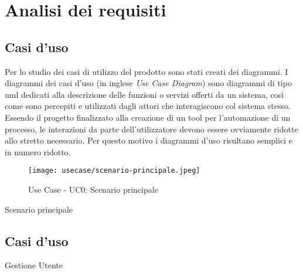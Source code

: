 \chapter{Analisi dei requisiti}
\label{cap:analisi-requisiti}

\section{Casi d'uso}

Per lo studio dei casi di utilizzo del prodotto sono stati creati dei diagrammi.
I diagrammi dei casi d'uso (in inglese \emph{Use Case Diagram}) sono diagrammi di tipo \gls{uml} dedicati alla descrizione delle funzioni o servizi offerti da un sistema, così come sono percepiti e utilizzati dagli attori che interagiscono col sistema stesso.
Essendo il progetto finalizzato alla creazione di un tool per l'automazione di un processo, le interazioni da parte dell'utilizzatore devono essere ovviamente ridotte allo stretto necessario. Per questo motivo i diagrammi d'uso risultano semplici e in numero ridotto.

\begin{figure}[ht] 
    \centering 
    \texttt{[image: usecase/scenario-principale.jpeg]} 
    \caption{Use Case - UC0: Scenario principale}
\end{figure}

\begin{usecase}{0}{Scenario principale}
\label{uc:scenario-principale}
\end{usecase}

\section{Casi d'uso}
\begin{usecase}{1}{Gestione Utente}
\end{usecase}

